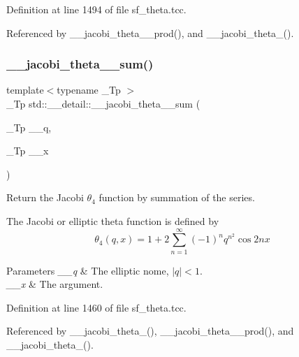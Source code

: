Definition at line 1494 of file sf\+\_\+theta.\+tcc.



Referenced by \+\_\+\+\_\+jacobi\+\_\+theta\+\_\+\_\+prod(), and \+\_\+\+\_\+jacobi\+\_\+theta\+\_().

\mbox{\label{namespacestd_1_1____detail_a6f1dd356335537ad693089ccb8d8c755}} 
\subsubsection{\texorpdfstring{\+\_\+\+\_\+jacobi\+\_\+theta\+\_\+\_\+sum()}{\_\_jacobi\_theta\_4\_sum()}}
{\footnotesize\ttfamily template$<$typename \+\_\+\+Tp $>$ \\
\+\_\+\+Tp std\+::\+\_\+\+\_\+detail\+::\+\_\+\+\_\+jacobi\+\_\+theta\+\_\+\_\+sum (\begin{DoxyParamCaption}\item[{\+\_\+\+Tp}]{\+\_\+\+\_\+q,  }\item[{\+\_\+\+Tp}]{\+\_\+\+\_\+x }\end{DoxyParamCaption})}

Return the Jacobi $ \theta_4 $ function by summation of the series.

The Jacobi or elliptic theta function is defined by \[ \theta_4(q,x) = 1 + 2\sum_{n=1}^{\infty}(-1)^n q^{n^2}\cos{2nx} \]


\begin{DoxyParams}{Parameters}
{\em \+\_\+\+\_\+q} & The elliptic nome, $ |q| < 1 $. \\
\hline
{\em \+\_\+\+\_\+x} & The argument. \\
\hline
\end{DoxyParams}


Definition at line 1460 of file sf\+\_\+theta.\+tcc.



Referenced by \+\_\+\+\_\+jacobi\+\_\+theta\+\_(), \+\_\+\+\_\+jacobi\+\_\+theta\+\_\+\_\+prod(), and \+\_\+\+\_\+jacobi\+\_\+theta\+\_().

\mbox{\label{namespacestd_1_1____detail_a53800598007d45e144cf147c2408a3d6}} 
